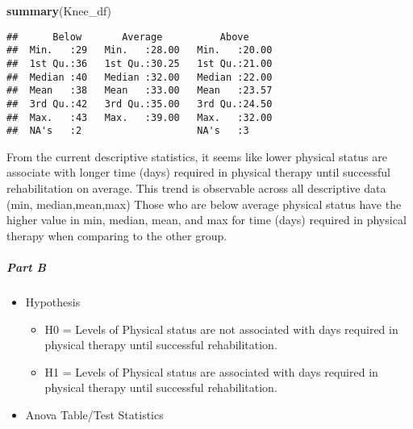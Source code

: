 \documentclass[]{article}
\newenvironment{Shaded}{\begin{snugshade}}{\end{snugshade}}
\newcommand{\CommentTok}[1]{\textcolor[rgb]{0.56,0.35,0.01}{\textit{#1}}}
\newcommand{\DataTypeTok}[1]{\textcolor[rgb]{0.13,0.29,0.53}{#1}}
\newcommand{\KeywordTok}[1]{\textcolor[rgb]{0.13,0.29,0.53}{\textbf{#1}}}
\newcommand{\NormalTok}[1]{#1}
\newcommand{\OperatorTok}[1]{\textcolor[rgb]{0.81,0.36,0.00}{\textbf{#1}}}
\newcommand{\StringTok}[1]{\textcolor[rgb]{0.31,0.60,0.02}{#1}}
\providecommand{\tightlist}{%
  \setlength{\itemsep}{0pt}\setlength{\parskip}{0pt}}
\let\oldsubparagraph\subparagraph
\renewcommand{\subparagraph}[1]{\oldsubparagraph{#1}\mbox{}}
\begin{document}
\begin{Shaded}
\begin{Highlighting}[]
\KeywordTok{summary}\NormalTok{(Knee_df)}
\end{Highlighting}
\end{Shaded}

\begin{verbatim}
##      Below       Average          Above      
##  Min.   :29   Min.   :28.00   Min.   :20.00  
##  1st Qu.:36   1st Qu.:30.25   1st Qu.:21.00  
##  Median :40   Median :32.00   Median :22.00  
##  Mean   :38   Mean   :33.00   Mean   :23.57  
##  3rd Qu.:42   3rd Qu.:35.00   3rd Qu.:24.50  
##  Max.   :43   Max.   :39.00   Max.   :32.00  
##  NA's   :2                    NA's   :3
\end{verbatim}

From the current descriptive statistics, it seems like lower physical
status are associate with longer time (days) required in physical
therapy until successful rehabilitation on average. This trend is
observable across all descriptive data (min, median,mean,max) Those who
are below average physical status have the higher value in min, median,
mean, and max for time (days) required in physical therapy when
comparing to the other group.

\hypertarget{part-b}{%
\subparagraph{Part B}\label{part-b}}

\begin{itemize}
\tightlist
\item
  Hypothesis

  \begin{itemize}
  \tightlist
  \item
    H0 = Levels of Physical status are not associated with days required
    in physical therapy until successful rehabilitation.
  \item
    H1 = Levels of Physical status are associated with days required in
    physical therapy until successful rehabilitation.
  \end{itemize}
\item
  Anova Table/Test Statistics
\end{itemize}

\begin{Shaded}
\end{Shaded}
\end{document}
